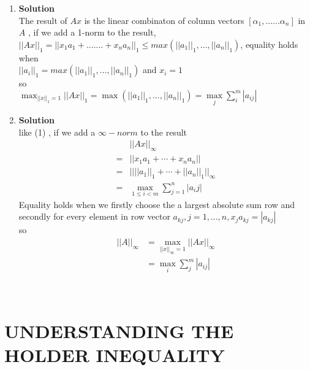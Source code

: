\documentclass[english,onecolumn,UTF8]{IEEEtran}
\begin{document}
\begin{enumerate}
\item\textbf{Solution}\\
The result of $Ax$ is the linear combinaton of column vectors $[\alpha_{1},......\alpha_{n}]$ in $A$ , if we add a 1-norm to the result,$||Ax||_{1}=||x_{1}a_{1}+.......+x_{n}a_{n}||_{1}\leq max(||a_{1}||_{1},...,||a_{n}||_{1})$, equality holds when\\ $||a_{i}||_{1}=max(||a_{1}||_{1},...,||a_{n}||_{1})$ and $x_{i}=1$ \\
so \\
$
\max_{||x||_{1}=1}||Ax||_{1} = \max(||a_{1}||_{1},...,||a_{n}||_{1})=\max\limits_{j}\sum\limits_{i}^{m}|a_{ij}|
$

\item\textbf{Solution}\\
like (1) , if we add a $\infty-norm$ to the result\\
\begin{align*}
	&||Ax||_\infty\\
	=&||x_1a_1+\cdots+x_na_n||\\
	=&||||a_1||_1+\cdots+||a_n||_1||_\infty\\
	=&\max_{1\leq i<m}\sum_{j=1}^n|a_ij|
\end{align*}
Equality holds when we firstly choose the a largest absolute sum row and secondly for every element in row vector $a_{kj},j=1,...,n, x_ja_{kj}=|a_{kj}|$ \\
so 
\begin{align*}
	||A||_{\infty} &=\max_{||x||_{\infty}=1}||Ax||_{\infty}\\
	&=\max_{i}\sum_{j}^{m}|a_{ij}|
\end{align*}
\end{enumerate}

~\\
\section{UNDERSTANDING THE HOLDER INEQUALITY}
\end{document}
